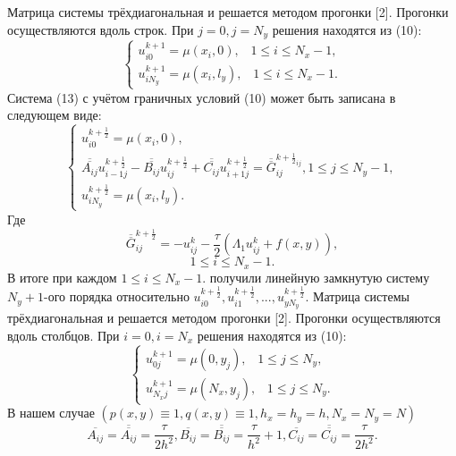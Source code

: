 \documentclass[a4paper, 12pt]{article}
\begin{document}
	Матрица системы трёхдиагональная и решается методом прогонки [2].
	\newline
	Прогонки осуществляются вдоль строк. При $j = 0, j = N_y$ решения находятся из (10):
	\begin{equation}
		\begin{cases}
			u^{k+1}_{i 0} = \mu(x_i, 0), \;\;\; 1 \le i \le N_x-1, \\
			u^{k+1}_{i N_y} = \mu(x_i, l_y), \;\;\; 1 \le i \le N_x-1.
		\end{cases}
	\end{equation}
	Система (13) с учётом граничных условий (10) может быть записана в следующем виде:
	\begin{equation}
		\begin{cases}
			u^{k + \frac{1}{2}}_{i 0} = \mu(x_i, 0), \\
			\overline{\overline{A_{i j}}} u^{k + \frac{1}{2}}_{i-1 j} - \overline{\overline{B_{i j}}} u^{k + \frac{1}{2}}_{i j} + \overline{\overline{C_{i j}}} u^{k + \frac{1}{2}}_{i+1 j} = \overline{\overline{G}}^{k+\frac{1}{2}_{ij}}_{i j}, 1 \le j \le N_y-1, \\
			u^{k + \frac{1}{2}}_{i N_y} = \mu(x_i, l_y).
		\end{cases}
	\end{equation}
	Где
	\begin{equation}
		\overline{\overline{G}}^{k+\frac{1}{2}}_{i j} = -u^k_{i j} - \frac{\tau}{2} (\Lambda_1 u^k_{i j} + f(x, y)),
	\end{equation}
	$$1 \le i \le N_x-1.$$
	В итоге при каждом $1 \le i \le N_x-1.$ получили линейную замкнутую систему $N_y+1$-ого порядка относительно $u^{k + \frac{1}{2}}_{i 0}, u^{k + \frac{1}{2}}_{i 1}, ... , u^{k + \frac{1}{2}}_{y N_y}.$
	Матрица системы трёхдиагональная и решается методом прогонки [2].
	\newline
	Прогонки осуществляются вдоль столбцов. При $i = 0, i = N_x$ решения находятся из (10):
	\begin{equation}
		\begin{cases}
			u^{k+1}_{0 j} = \mu(0, y_j), \;\;\; 1 \le j \le N_y, \\
			u^{k+1}_{N_x j} = \mu(N_x, y_j), \;\;\; 1 \le j \le N_y.
		\end{cases}
	\end{equation}
	В нашем случае $(p(x, y) \equiv 1, q(x, y) \equiv 1, h_x = h_y = h, N_x = N_y = N)$
	\begin{equation}
		\overline{A_{i j}} = \overline{\overline{A_{i j}}} = \frac{\tau}{2 h^2}, \overline{B_{i j}} = \overline{\overline{B_{i j}}} = \frac{\tau}{h^2} + 1, \overline{C_{i j}} = \overline{\overline{C_{i j}}} = \frac{\tau}{2 h^2}.	
	\end{equation}
	
\end{document}
